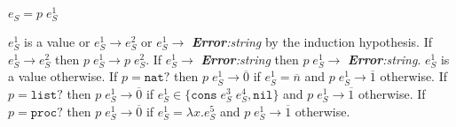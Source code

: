 \begin{case}
$e_{S}=p\;e_{S}^{1}$

$e_{S}^{1}$ is a value or $e_{S}^{1}\rightarrow e_{S}^{2}$ or $e_{S}^{1}\rightarrow$ \emph{\textbf{Error}:\;string} by the induction hypothesis.  If $e_{S}^{1}\rightarrow e_{S}^{2}$ then $p\;e_{S}^{1}\rightarrow p\;e_{S}^{2}$.  If $e_{S}^{1}\rightarrow$ \emph{\textbf{Error}:\;string} then $p\;e_{S}^{1}\rightarrow$ \emph{\textbf{Error}:\;string}.  $e_{S}^{1}$ is a value otherwise.  If $p=\mathtt{nat?}$ then $p\;e_{S}^{1}\rightarrow\overline{0}$ if $e_{S}^{1}=\overline{n}$ and $p\;e_{S}^{1}\rightarrow\overline{1}$ otherwise.  If $p=\mathtt{list?}$ then $p\;e_{S}^{1}\rightarrow\overline{0}$ if $e_{S}^{1}\in\lbrace\mathtt{cons}\;e_{S}^{3}\;e_{S}^{4},\mathtt{nil}\rbrace$ and $p\;e_{S}^{1}\rightarrow\overline{1}$ otherwise.  If $p=\mathtt{proc?}$ then $p\;e_{S}^{1}\rightarrow\overline{0}$ if $e_{S}^{1}=\lambda x.e_{S}^{5}$ and $p\;e_{S}^{1}\rightarrow\overline{1}$ otherwise.
\end{case}